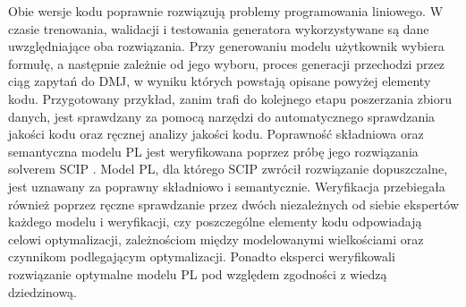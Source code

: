 Obie wersje kodu poprawnie rozwiązują problemy programowania liniowego. W czasie trenowania, walidacji i testowania generatora wykorzystywane są dane uwzględniające oba rozwiązania. Przy generowaniu modelu  użytkownik wybiera formułę, a następnie zależnie od jego wyboru, proces generacji przechodzi przez ciąg zapytań do DMJ, w wyniku których powstają opisane powyżej elementy kodu. %
Przygotowany przykład, zanim trafi do kolejnego etapu poszerzania zbioru danych, jest sprawdzany za pomocą narzędzi do automatycznego sprawdzania jakości kodu oraz ręcznej analizy jakości kodu. Poprawność składniowa oraz semantyczna modelu PL jest weryfikowana poprzez próbę jego rozwiązania solverem SCIP \cite{scip_documentation}. Model PL, dla którego SCIP zwrócił rozwiązanie dopuszczalne, jest uznawany za poprawny składniowo i semantycznie. Weryfikacja przebiegała również poprzez ręczne sprawdzanie przez dwóch niezależnych od siebie ekspertów każdego modelu i weryfikacji, czy poszczególne elementy kodu odpowiadają celowi optymalizacji, zależnościom między modelowanymi wielkościami oraz czynnikom podlegającym optymalizacji. Ponadto eksperci weryfikowali rozwiązanie optymalne modelu PL pod względem zgodności z wiedzą dziedzinową.


